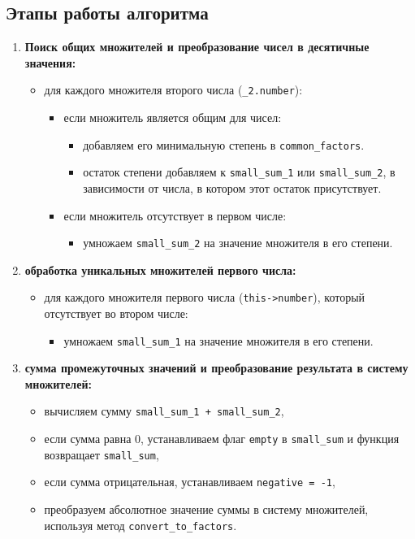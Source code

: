 \subsection*{Этапы работы алгоритма}
\begin{enumerate}
	\item \textbf{Поиск общих множителей и преобразование чисел в десятичные значения:}
	\begin{itemize}
		\item для каждого множителя второго числа (\texttt{\_2.number}):
		\begin{itemize}
			\item если множитель является общим для чисел:
			\begin{itemize}
				\item добавляем его минимальную степень в \texttt{common\_factors}.
				\item остаток степени добавляем к \texttt{small\_sum\_1} или \texttt{small\_sum\_2}, в зависимости от числа, в котором этот остаток присутствует.
			\end{itemize}
			\item если множитель отсутствует в первом числе:
			\begin{itemize}
				\item умножаем \texttt{small\_sum\_2} на значение множителя в его степени.
			\end{itemize}
		\end{itemize}
	\end{itemize}
	
	\item \textbf{обработка уникальных множителей первого числа:}
	\begin{itemize}
		\item для каждого множителя первого числа (\texttt{this->number}), который отсутствует во втором числе:
		\begin{itemize}
			\item умножаем \texttt{small\_sum\_1} на значение множителя в его степени.
		\end{itemize}
	\end{itemize}
	
	\item \textbf{сумма промежуточных значений и преобразование результата в систему множителей:}
	\begin{itemize}
		\item вычисляем сумму \texttt{small\_sum\_1 + small\_sum\_2},
		\item если сумма равна 0, устанавливаем флаг \texttt{empty} в \texttt{small\_sum} и функция возвращает \texttt{small\_sum},
		\item если сумма отрицательная, устанавливаем \texttt{negative = -1},
		\item преобразуем абсолютное значение суммы в систему множителей, используя метод \texttt{convert\_to\_factors}.
	\end{itemize}
	

\end{enumerate}
